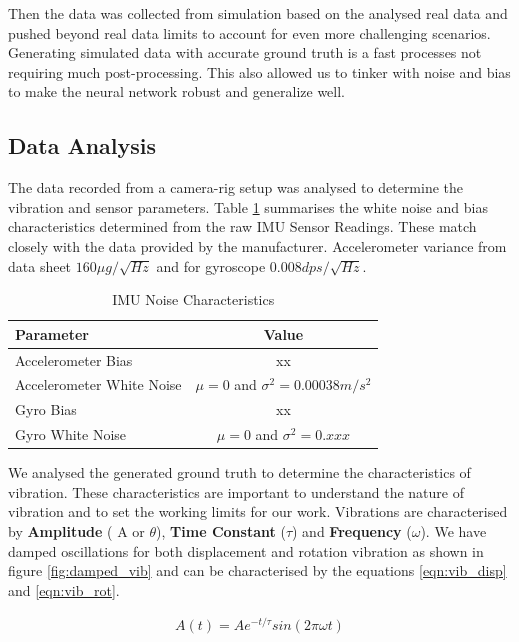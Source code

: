 Then the data was collected from simulation based on the analysed real data and pushed beyond real data limits to account for even more challenging scenarios. Generating simulated data with accurate ground truth is a fast processes not requiring much post-processing. This also allowed us to tinker with noise and bias to make the neural network robust and generalize well.

\subsection{Data Analysis}
\label{data_analysis}
The data recorded from a camera-rig setup was analysed to determine the vibration and sensor parameters. Table \ref{tab:imu_noise_characteristics} summarises the white noise and bias characteristics determined from the raw IMU Sensor Readings. These match closely with the data provided by the manufacturer. Accelerometer variance from data sheet $ 160 \mu g /\sqrt{Hz} $ and for gyroscope $ 0.008 dps /\sqrt{Hz}  $.

\begin{table}[H]
\centering
\begin{tabular}{l|c}
    \textbf{Parameter} & \textbf{Value} \\ \hline
    Accelerometer Bias & xx \\  
    Accelerometer White Noise & $ \mu = 0 $ and $ \sigma^{2}=0.00038 m/s^{2}$ \\  
    Gyro Bias & xx \\  
    Gyro White Noise & $ \mu = 0 $ and $ \sigma^{2}=0.xxx $ \\  
\end{tabular}
\caption{IMU Noise Characteristics}
\label{tab:imu_noise_characteristics}
\end{table}

We analysed the generated ground truth to determine the characteristics of vibration. These characteristics are important to understand the nature of vibration and to set the working limits for our work. Vibrations are characterised by \textbf{Amplitude} ( A or  $ \theta $), \textbf{Time Constant} ($ \tau $) and \textbf{Frequency} ($ \omega $). We have damped oscillations for both displacement and rotation vibration as shown in figure \ref{fig:damped_vib} and can be characterised by the equations \ref{eqn:vib_disp} and \ref{eqn:vib_rot}.

\begin{equation}
  \label{eqn:vib_disp}
  \begin{aligned}
    A(t) = Ae^{-t/\tau}sin(2\pi\omega t) \\
  \end{aligned}
\end{equation}

